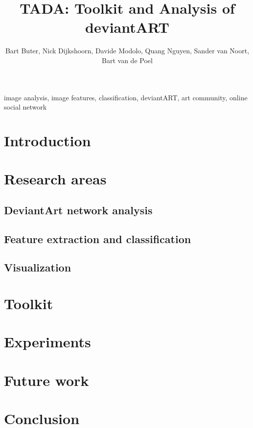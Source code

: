 \documentclass[10pt,journal,compsoc]{IEEEtran}
\begin{document}
\title{TADA: Toolkit and Analysis of deviantART}
\author{Bart Buter, Nick Dijkshoorn, Davide Modolo, Quang Nguyen, Sander van Noort, Bart van de Poel}

\maketitle

\begin{abstract}

\end{abstract}


\begin{keywords}
image analysis, image features, classification, deviantART, art community, online social network
\end{keywords}


\section{Introduction}



\section{Research areas}
	\subsection{DeviantArt network analysis}
	
	\subsection{Feature extraction and classification}
	
	\subsection{Visualization}
	


\section{Toolkit}


\section{Experiments}



\section{Future work}


\section{Conclusion}


%




\pagebreak
\tableofcontents
\end{document}
